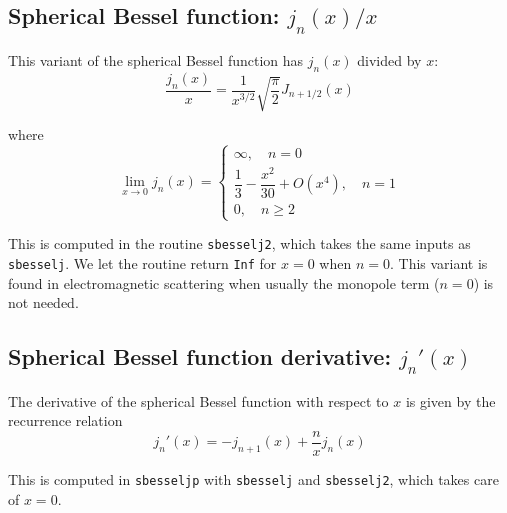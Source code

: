 {\footnotesize
{}
}

\subsection{Spherical Bessel function: $j_n(x)/x$}


This variant of the spherical Bessel function has $j_n(x)$ divided by $x$: 
\begin{equation}
\dfrac{j_n(x)}{x} = \dfrac{1}{x^{3/2}}\sqrt{\dfrac{\pi}{2}}J_{n+1/2}(x)
\end{equation}

\noindent where
\begin{equation}
\lim_{x\rightarrow0}j_n(x) = \left\{ \begin{array}{c} \infty, \quad n=0 \\ \dfrac{1}{3} - \dfrac{x^2}{30} + O(x^4), \quad n = 1 \\ 0, \quad n \ge 2\end{array}  \right.
\end{equation}

This is computed in the routine \texttt{sbesselj2}, which takes the same inputs as \texttt{sbesselj}.  We let the routine return \texttt{Inf} for $x=0$ when $n=0$.  This variant is found in electromagnetic scattering when usually the monopole term ($n=0$) is not needed.

{\footnotesize
{}
}

\subsection{Spherical Bessel function derivative: $j_n'(x)$}

The derivative of the spherical Bessel function with respect to $x$ is given by the recurrence relation
\begin{equation}
j_n'(x) = -j_{n+1}(x) + \dfrac{n}{x}j_n(x)
\end{equation}

This is computed in \texttt{sbesseljp} with \texttt{sbesselj} and \texttt{sbesselj2}, which takes care of $x=0$. 

{\footnotesize
{}
}

